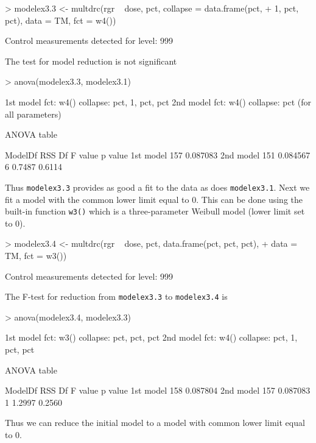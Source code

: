\documentclass[a4paper]{article}
\begin{document}
\begin{Schunk}
\begin{Sinput}
> modelex3.3 <- multdrc(rgr ~ dose, pct, collapse = data.frame(pct, 
+     1, pct, pct), data = TM, fct = w4())
\end{Sinput}
\begin{Soutput}
Control measurements detected for level: 999
\end{Soutput}
\end{Schunk}
The test for model reduction is not significant

\begin{Schunk}
\begin{Sinput}
> anova(modelex3.3, modelex3.1)
\end{Sinput}
\begin{Soutput}
1st model
 fct:      w4()
 collapse: pct, 1, pct, pct
2nd model
 fct:      w4()
 collapse: pct (for all parameters)

ANOVA table

          ModelDf      RSS  Df F value p value
1st model     157 0.087083                    
2nd model     151 0.084567   6  0.7487  0.6114
\end{Soutput}
\end{Schunk}
Thus \verb+modelex3.3+ provides as good a fit to the data as does \verb+modelex3.1+. Next we fit a model with the common lower limit equal to 0. This
can be done using the built-in function \verb+w3()+ which is a three-parameter Weibull model (lower limit set to 0).

\begin{Schunk}
\begin{Sinput}
> modelex3.4 <- multdrc(rgr ~ dose, pct, data.frame(pct, pct, pct), 
+     data = TM, fct = w3())
\end{Sinput}
\begin{Soutput}
Control measurements detected for level: 999
\end{Soutput}
\end{Schunk}
The F-test for reduction from \verb+modelex3.3+ to \verb+modelex3.4+ is

\begin{Schunk}
\begin{Sinput}
> anova(modelex3.4, modelex3.3)
\end{Sinput}
\begin{Soutput}
1st model
 fct:      w3()
 collapse: pct, pct, pct
2nd model
 fct:      w4()
 collapse: pct, 1, pct, pct

ANOVA table

          ModelDf      RSS  Df F value p value
1st model     158 0.087804                    
2nd model     157 0.087083   1  1.2997  0.2560
\end{Soutput}
\end{Schunk}
Thus we can reduce the initial model to a model with common lower limit equal to 0.
\end{document}
